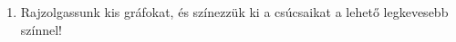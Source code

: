 \documentclass[a4paper, 12pt]{article}
\begin{document}
	\begin{enumerate}
		\item 	Rajzolgassunk kis gráfokat, és színezzük ki a csúcsaikat a lehető legkevesebb színnel!
			\begin{figure}[h]
			\centering
				\begin{subfigure}[b]{0.4\textwidth}
					
				\end{subfigure}
				\begin{subfigure}[b]{0.4\textwidth}
					
				\end{subfigure}
			\end{figure}
			\begin{figure}[h]
			\centering
				\begin{subfigure}[b]{0.4\textwidth}
					
				\end{subfigure}
				\begin{subfigure}[b]{0.4\textwidth}
					
				\end{subfigure}
			\end{figure}
	\end{enumerate}
\end{document}
